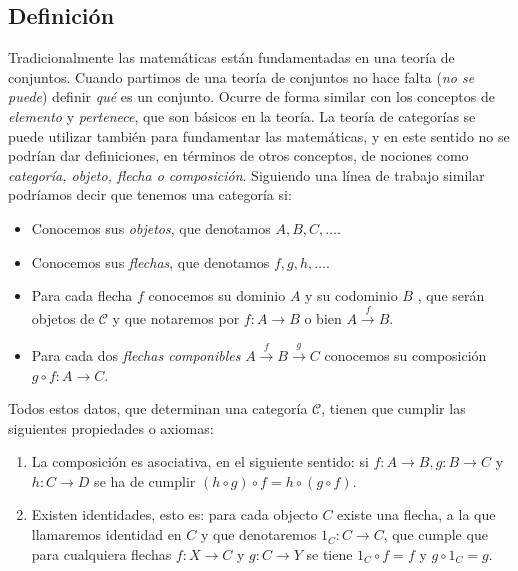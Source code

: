 \subsection{Definición}
Tradicionalmente las matemáticas están fundamentadas en una teoría
de conjuntos. Cuando partimos de una teoría de conjuntos no hace
falta (\textit{no se puede}) definir \textit{qué} es un conjunto. Ocurre de
forma similar con los conceptos de \emph{elemento} y \emph{pertenece},
que son básicos en la teoría. La teoría de categorías se puede utilizar
también para fundamentar las matemáticas, y en este sentido no se
podrían dar definiciones, en términos de otros conceptos,
de nociones como \emph{categoría, objeto, flecha o composición}.
Siguiendo una línea de trabajo similar podríamos decir que tenemos
una categoría si:
\begin{itemize}
\item Conocemos sus \textit{objetos},
  que denotamos $A,B,C,\ldots.$
\item Conocemos sus \textit{flechas},
  que denotamos $f,g,h,\ldots.$
\item Para cada flecha $f$ conocemos su dominio $A$ y su codominio $B$
  , que serán objetos de $\mathcal{C}$ y que notaremos por
  $f:A\rightarrow B$ o bien $A\xrightarrow{f} B$.
\item Para cada dos \emph{flechas componibles}
  $A\xrightarrow{f} B\xrightarrow{g} C$
  conocemos su composición
  $g\circ f :A\rightarrow C$.
\end{itemize}
Todos estos datos, que determinan una categoría $\mathcal{C}$, tienen que cumplir las siguientes propiedades o axiomas:
\begin{enumerate}
\item La composición es asociativa, en el siguiente sentido: si $f : A \longrightarrow B, g: B \longrightarrow C$ y $h : C \longrightarrow D$ se ha de cumplir
  $(h \circ g) \circ f = h \circ (g \circ f)$.
\item Existen identidades, esto es: para cada objecto $C$ existe una
  flecha, a la que llamaremos identidad en $C$ y que denotaremos $1_C : C \longrightarrow C$, que cumple que
  para cualquiera flechas $f: X \longrightarrow C$ y  $g : C \longrightarrow Y$ se tiene
  $1_C \circ f = f$  y  $g \circ 1_C = g$.
\end{enumerate}

